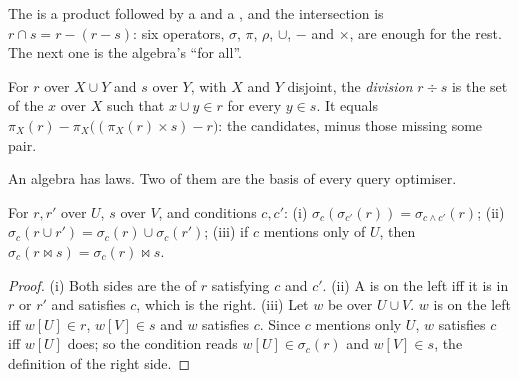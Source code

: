 The  is a product followed by a  and a , and the intersection is $r \cap s = r - (r -
s)$: six operators, $\sigma$, $\pi$, $\rho$, $\cup$, $-$ and $\times$, are enough for the rest. The next one is the
algebra's ``for all''.

\begin{definition}[Division]\label{def:b1:relational-model:division}
For $r$ over $X \cup Y$ and $s$ over $Y$, with $X$ and $Y$ disjoint, the \emph{division} $r \div s$ is the set of the  $x$ over $X$ such that $x \cup y \in r$ for every $y \in s$. It equals
$\pi_X(r) - \pi_X\big((\pi_X(r) \times s) - r\big)$: the candidates, minus those missing some pair.
\end{definition}

\label{lst:b1:relational-model:algebra}

\label{lst:b1:relational-model:demo}

\label{out:b1:relational-model:demo}

An algebra has laws. Two of them are the basis of every query optimiser.

\begin{proposition}\label{prop:b1:relational-model:pushdown}
For  $r, r'$ over $U$, $s$ over $V$, and conditions $c, c'$:
(i) $\sigma_c(\sigma_{c'}(r)) = \sigma_{c \wedge c'}(r)$;
(ii) $\sigma_c(r \cup r') = \sigma_c(r) \cup \sigma_c(r')$;
(iii) if $c$ mentions only  of $U$, then $\sigma_c(r \bowtie s) = \sigma_c(r) \bowtie s$.
\end{proposition}

\begin{proof}
(i) Both sides are the  of $r$ satisfying $c$ and $c'$. (ii) A  is on the left iff it is in $r$ or $r'$ and
satisfies $c$, which is the right. (iii) Let $w$ be over $U \cup V$. $w$ is on the left iff $w[U] \in r$, $w[V] \in s$ and
$w$ satisfies $c$. Since $c$ mentions only $U$, $w$ satisfies $c$ iff $w[U]$ does; so the condition reads $w[U] \in
\sigma_c(r)$ and $w[V] \in s$, the definition of the right side.
\end{proof}

